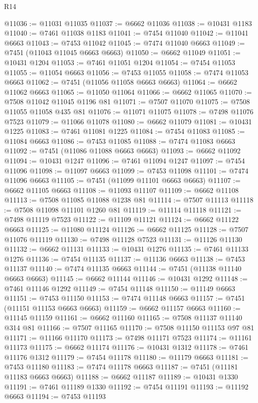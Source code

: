\begin{lexlean}{R14}
\begin{coremodule}
@11036 := @11031 @11035
@11037 := @6662 @11036
@11038 := @10431 @1183
@11040 := @7461 @11038 @1183
@11041 := @7454 @11040
@11042 := @11041 @6663
@11043 := @7453 @11042
@11045 := @7474 @11040 @6663
@11049 := @7451 (@11043 @11045 @6663 @6663)
@11050 := @6662 @11049
@11051 := @10431 @1204
@11053 := @7461 @11051 @1204
@11054 := @7454 @11053
@11055 := @11054 @6663
@11056 := @7453 @11055
@11058 := @7474 @11053 @6663
@11062 := @7451 (@11056 @11058 @6663 @6663)
@11064 := @6662 @11062 @6663
@11065 := @11050 @11064
@11066 := @6662 @11065
@11070 := @7508 @11042 @11045 @1196 @81
@11071 := @7507 @11070
@11075 := @7508 @11055 @11058 @435 @81
@11076 := @11071 @11075
@11078 := @7498 @11076 @7523
@11079 := @11066 @11078
@11080 := @6662 @11079
@11081 := @10431 @1225
@11083 := @7461 @11081 @1225
@11084 := @7454 @11083
@11085 := @11084 @6663
@11086 := @7453 @11085
@11088 := @7474 @11083 @6663
@11092 := @7451 (@11086 @11088 @6663 @6663)
@11093 := @6662 @11092
@11094 := @10431 @1247
@11096 := @7461 @11094 @1247
@11097 := @7454 @11096
@11098 := @11097 @6663
@11099 := @7453 @11098
@11101 := @7474 @11096 @6663
@11105 := @7451 (@11099 @11101 @6663 @6663)
@11107 := @6662 @11105 @6663
@11108 := @11093 @11107
@11109 := @6662 @11108
@11113 := @7508 @11085 @11088 @1238 @81
@11114 := @7507 @11113
@11118 := @7508 @11098 @11101 @1260 @81
@11119 := @11114 @11118
@11121 := @7498 @11119 @7523
@11122 := @11109 @11121
@11124 := @6662 @11122 @6663
@11125 := @11080 @11124
@11126 := @6662 @11125
@11128 := @7507 @11076 @11119
@11130 := @7498 @11128 @7523
@11131 := @11126 @11130
@11132 := @6662 @11131
@11133 := @10431 @1276
@11135 := @7461 @11133 @1276
@11136 := @7454 @11135
@11137 := @11136 @6663
@11138 := @7453 @11137
@11140 := @7474 @11135 @6663
@11144 := @7451 (@11138 @11140 @6663 @6663)
@11145 := @6662 @11144
@11146 := @10431 @1292
@11148 := @7461 @11146 @1292
@11149 := @7454 @11148
@11150 := @11149 @6663
@11151 := @7453 @11150
@11153 := @7474 @11148 @6663
@11157 := @7451 (@11151 @11153 @6663 @6663)
@11159 := @6662 @11157 @6663
@11160 := @11145 @11159
@11161 := @6662 @11160
@11165 := @7508 @11137 @11140 @314 @81
@11166 := @7507 @11165
@11170 := @7508 @11150 @11153 @97 @81
@11171 := @11166 @11170
@11173 := @7498 @11171 @7523
@11174 := @11161 @11173
@11175 := @6662 @11174
@11176 := @10431 @1312
@11178 := @7461 @11176 @1312
@11179 := @7454 @11178
@11180 := @11179 @6663
@11181 := @7453 @11180
@11183 := @7474 @11178 @6663
@11187 := @7451 (@11181 @11183 @6663 @6663)
@11188 := @6662 @11187
@11189 := @10431 @1330
@11191 := @7461 @11189 @1330
@11192 := @7454 @11191
@11193 := @11192 @6663
@11194 := @7453 @11193

\end{coremodule}
\end{lexlean}
